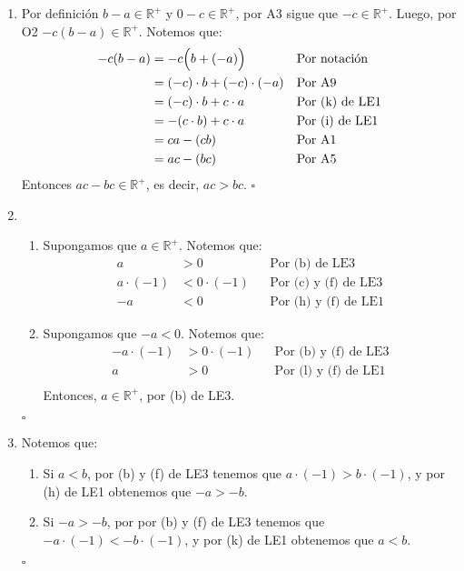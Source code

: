\documentclass[11pt]{article}
\begin{document}
\begin{enumerate}[label=\alph*),font=\bfseries]

    \item Por definición $b-a \in \mathbb{R}^+$ y $0 - c \in \mathbb{R}^+$, por A3 sigue que $ -c \in \mathbb{R}^+$. Luego, por O2 $-c(b-a) \in \mathbb{R}^+$. Notemos que:
    \begin{align*}
        -c(b-a) &= -c \Bigl( b + (-a) \Bigr) && \text{Por notación}\\
        &= (-c) \cdot b + (-c) \cdot (-a) && \text{Por A9}\\
        &= (-c) \cdot b + c \cdot a && \text{Por (k) de LE1}\\
        &= -(c \cdot b) + c \cdot a && \text{Por (i) de LE1}\\
        &= ca -(cb) && \text{Por A1}\\
        &= ac - (bc) && \text{Por A5}\\
    \end{align*}
    Entonces $ac - bc \in \mathbb{R}^+$, es decir, $ac>bc$. \mbox{}\hfill $\square$


    \item
    \begin{enumerate}[label=\roman*),font=\bfseries]
    \item Supongamos que $a \in \mathbb{R}^+$. Notemos que:
    \begin{align*}
        a &> 0 && \text{Por (b) de LE3}\\
        a \cdot (-1) &< 0 \cdot (-1) && \text{Por (c) y (f) de LE3}\\
        -a &< 0 && \text{Por (h) y (f) de LE1}
    \end{align*}
    \item Supongamos que $-a<0$. Notemos que:
    \begin{align*}
        -a \cdot (-1) &> 0 \cdot (-1) && \text{Por (b) y (f) de LE3}\\
        a &> 0 && \text{Por (l) y (f) de LE1}\\
    \end{align*}
    Entonces, $a \in \mathbb{R}^+$, por (b) de LE3.
    \end{enumerate}
    \mbox{}\hfill $\square$


    \item Notemos que:
    \begin{enumerate}[label=\roman*),font=\bfseries]
        \item Si $a<b$, por (b) y (f) de LE3 tenemos que $a \cdot (-1) > b \cdot (-1)$, y por (h) de LE1 obtenemos que $-a > -b$.
        \item Si $-a > -b$, por por (b) y (f) de LE3 tenemos que $-a \cdot (-1) < -b \cdot (-1)$, y por (k) de LE1 obtenemos que $a<b$.
    \end{enumerate}
    \mbox{}\hfill $\square$


\end{enumerate}
\end{document}
